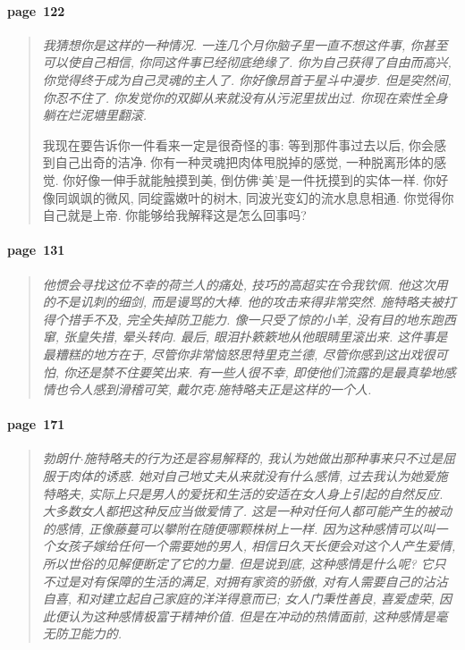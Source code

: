 \paragraph*{page~122}
\begin{quotation}
    \itshape
    我猜想你是这样的一种情况. 一连几个月你脑子里一直不想这件事, 你甚至可以使自己相信, 你同这件事已经彻底绝缘了. 你为自己获得了自由而高兴, 你觉得终于成为自己灵魂的主人了. 你好像昂首于星斗中漫步. 但是突然间, 你忍不住了. 你发觉你的双脚从来就没有从污泥里拔出过. 你现在索性全身躺在烂泥塘里翻滚. 

    我现在要告诉你一件看来一定是很奇怪的事: 等到那件事过去以后, 你会感到自己出奇的洁净. 你有一种灵魂把肉体甩脱掉的感觉, 一种脱离形体的感觉. 你好像一伸手就能触摸到美, 倒仿佛`美'是一件抚摸到的实体一样. 你好像同飒飒的微风, 同绽露嫩叶的树木, 同波光变幻的流水息息相通. 你觉得你自己就是上帝. 你能够给我解释这是怎么回事吗?
\end{quotation}

\paragraph*{page~131}
\begin{quotation}
    \itshape
    他惯会寻找这位不幸的荷兰人的痛处, 技巧的高超实在令我钦佩. 他这次用的不是讥刺的细剑, 而是谩骂的大棒. 他的攻击来得非常突然. 施特略夫被打得个措手不及, 完全失掉防卫能力. 像一只受了惊的小羊, 没有目的地东跑西窜, 张皇失措, 晕头转向. 最后, 眼泪扑簌簌地从他眼睛里滚出来. 这件事是最糟糕的地方在于, 尽管你非常恼怒思特里克兰德, 尽管你感到这出戏很可怕, 你还是禁不住要笑出来. 有一些人很不幸, 即使他们流露的是最真挚地感情也令人感到滑稽可笑, 戴尔克$\cdot$施特略夫正是这样的一个人. 
\end{quotation}

\paragraph*{page~171}
\begin{quotation}
    \itshape
    勃朗什$\cdot$施特略夫的行为还是容易解释的, 我认为她做出那种事来只不过是屈服于肉体的诱惑. 她对自己地丈夫从来就没有什么感情, 过去我认为她爱施特略夫, 实际上只是男人的爱抚和生活的安适在女人身上引起的自然反应. 大多数女人都把这种反应当做爱情了. 这是一种对任何人都可能产生的被动的感情, 正像藤蔓可以攀附在随便哪颗株树上一样. 因为这种感情可以叫一个女孩子嫁给任何一个需要她的男人, 相信日久天长便会对这个人产生爱情, 所以世俗的见解便断定了它的力量. 但是说到底, 这种感情是什么呢? 它只不过是对有保障的生活的满足, 对拥有家资的骄傲, 对有人需要自己的沾沾自喜, 和对建立起自己家庭的洋洋得意而已; 女人门秉性善良, 喜爱虚荣, 因此便认为这种感情极富于精神价值. 但是在冲动的热情面前, 这种感情是毫无防卫能力的. 
\end{quotation}

